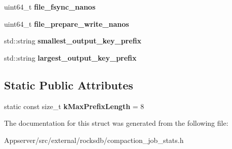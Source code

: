 \begin{DoxyCompactItemize}
\item 
uint64\+\_\+t {\bfseries file\+\_\+fsync\+\_\+nanos}\hypertarget{structrocksdb_1_1CompactionJobStats_ae9faea0656e11b736aeac6d35facc700}{}\label{structrocksdb_1_1CompactionJobStats_ae9faea0656e11b736aeac6d35facc700}

\item 
uint64\+\_\+t {\bfseries file\+\_\+prepare\+\_\+write\+\_\+nanos}\hypertarget{structrocksdb_1_1CompactionJobStats_a5cf8dcee3c51604d9a45fd221fab792a}{}\label{structrocksdb_1_1CompactionJobStats_a5cf8dcee3c51604d9a45fd221fab792a}

\item 
std\+::string {\bfseries smallest\+\_\+output\+\_\+key\+\_\+prefix}\hypertarget{structrocksdb_1_1CompactionJobStats_a566d94f35ffb42149030263118c51819}{}\label{structrocksdb_1_1CompactionJobStats_a566d94f35ffb42149030263118c51819}

\item 
std\+::string {\bfseries largest\+\_\+output\+\_\+key\+\_\+prefix}\hypertarget{structrocksdb_1_1CompactionJobStats_adcb6ac0e33c7eafd46999a2d152b018d}{}\label{structrocksdb_1_1CompactionJobStats_adcb6ac0e33c7eafd46999a2d152b018d}

\end{DoxyCompactItemize}
\subsection*{Static Public Attributes}
\begin{DoxyCompactItemize}
\item 
static const size\+\_\+t {\bfseries k\+Max\+Prefix\+Length} = 8\hypertarget{structrocksdb_1_1CompactionJobStats_a6cb8682c28a6fff939bc793d407fac95}{}\label{structrocksdb_1_1CompactionJobStats_a6cb8682c28a6fff939bc793d407fac95}

\end{DoxyCompactItemize}


The documentation for this struct was generated from the following file\+:\begin{DoxyCompactItemize}
\item 
Appserver/src/external/rocksdb/compaction\+\_\+job\+\_\+stats.\+h\end{DoxyCompactItemize}
